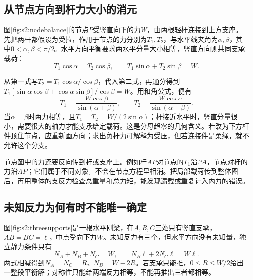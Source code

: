 \subsection{从节点方向到杆力大小的消元}
图\ref{fig:s2:nodebalance}的节点$P$受竖直向下的力$W$，由两根轻杆连接到上方支座。先把两杆都假设为受拉，作用于节点的力分别为$T_1,T_2$，与水平线夹角为$\alpha,\beta$，其中$0<\alpha,\beta<\pi/2$。水平方向平衡要求两水平分量大小相等，竖直方向则共同支承载荷：
\[
T_1\cos\alpha=T_2\cos\beta,\qquad
T_1\sin\alpha+T_2\sin\beta=W.
\]

从第一式写$T_2=T_1\cos\alpha/\cos\beta$，代入第二式，再通分得到$T_1[\sin\alpha\cos\beta+\cos\alpha\sin\beta]/\cos\beta=W$。用和角公式，便有
\[
T_1=\frac{W\cos\beta}{\sin(\alpha+\beta)},\qquad
T_2=\frac{W\cos\alpha}{\sin(\alpha+\beta)}.
\]
当$\alpha=\beta$时两力相等，且$T_1=T_2=W/(2\sin\alpha)$；杆接近水平时，竖直分量很小，需要很大的轴力才能支承给定载荷。这是分母趋零的几何含义。若改为下方杆件顶住节点，应重新画方向；求出负杆力可解释为受压，但若连接件是柔绳，就不允许这个分支。

节点图中的力还要反向传到杆或支座上。例如杆$AP$对节点的$T_1$沿$PA$，节点对杆的力沿$AP$；它们属于不同对象，不会在节点方程里相消。把局部载荷传到整体图后，再用整体的支反力检查总重量和总力矩，能发现漏载或重复计入内力的错误。

\subsection{未知反力为何有时不能唯一确定}
图\ref{fig:s2:threesupports}是一根水平刚梁，在$A,B,C$三处只有竖直支承，$AB=BC=\ell$，中点受向下力$W$。未知反力有三个，但水平方向没有未知量，独立静力条件只有
\[
N_A+N_B+N_C=W,\qquad
N_B\ell+2N_C\ell=W\ell.
\]
两式相减得到$N_A=N_C=R$、$N_B=W-2R$。若支承只能推，$0\le R\le W/2$给出一整段平衡解；对称性只能给两端反力相等，不能再推出三者都相等。

